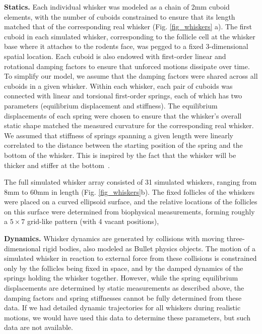\textbf{Statics.} Each individual whisker was modeled as a chain of 2mm cuboid elements, with the number of cuboids constrained to ensure that its length matched that of the corresponding real whisker (Fig. \ref{fig_whiskers} a).
The first cuboid in each simulated whisker, corresponding to the follicle cell at the whisker base where it attaches to the rodents face, was pegged to a fixed 3-dimensional spatial location.  
Each cuboid is also endowed with first-order linear and rotational damping factors to ensure that unforced motions dissipate over time. 
To simplify our model, we assume that the damping factors were shared across all cuboids in a given whisker.  
Within each whisker, each pair of cuboids was connected with linear and torsional first-order springs, each of which has two parameters (equilibrium displacement and stiffness).  
The equilibrium displacements of each spring were chosen to ensure that the whisker's overall static shape matched the measured curvature for the corresponding real whisker.   
We assumed that stiffness of springs spanning a given length were linearly correlated to the distance between the starting position of the spring and the bottom of the whisker. 
This is inspired by the fact that the whisker will be thicker and stiffer at the bottom~\cite{Hartmann:2015}.

The full simulated whisker array consisted of 31 simulated whiskers, ranging from 8mm to 60mm in length (Fig. \ref{fig_whiskers}b). 
The fixed follicles of the whiskers were placed on a curved ellipsoid surface, and the relative locations of the follicles on this surface were determined from biophysical measurements, forming roughly a $5\times7$ grid-like pattern (with 4 vacant positions),

\textbf{Dynamics.} Whisker dynamics are generated by collisions with moving three-dimensional rigid bodies, also modeled as Bullet physics objects.  
The motion of a simulated whisker in reaction to external force from these collisions is constrained only by the follicles being fixed in space, and by the damped dynamics of the springs holding the whisker together. 
However, while the spring equilibrium displacements are determined by static measurements as described above, the damping factors and spring stiffnesses cannot be fully determined from these data.  
If we had detailed dynamic trajectories for all whiskers during realistic motions, we would have used this data to determine these parameters, but such data are not available.  

